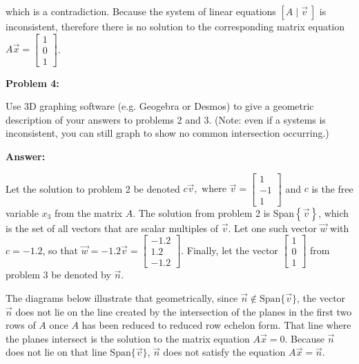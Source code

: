 \documentclass[10pt,letterpaper,final]{report}
\begin{document}
\noindent which is a contradiction. Because the system of linear equations $\left[A \mid \vec{v}\ \right]$ is inconsistent, therefore there is no solution to the corresponding matrix equation $A\vec{x} = \begin{bmatrix}1 \\0 \\1\end{bmatrix}$.

\pagebreak

\noindent\textbf{Problem 4:}
\medskip

Use 3D graphing software (e.g. Geogebra or Desmos) to give a geometric description of your answers to problems 2 and 3. (Note: even if a systems is inconsistent, you can still graph to show no common intersection occurring.)

\medskip
\noindent\textbf{Answer:}
\medskip

Let the solution to problem 2 be denoted $c\vec{v}, \text{ where }\vec{v} = \begin{bmatrix}1 \\-1 \\1\end{bmatrix}$ and $c$ is the free variable $x_3$ from the matrix $A$. The solution from problem 2 is Span$\left\{\vec{v}\right\}$, which is the set of all vectors that are scalar multiples of $\vec{v}$. Let one such vector $\vec{w}$ with $c = -1.2$, so that $\vec{w} = -1.2\vec{v} = \begin{bmatrix}-1.2\\1.2\\-1.2\end{bmatrix}$. Finally, let the vector $\begin{bmatrix}1 \\0 \\1\end{bmatrix}$ from problem 3 be denoted by $\vec{n}$.

The diagrams below illustrate that geometrically, since $\vec{n} \not\in \mathrm{Span}\{\vec{v}\}$, the vector $\vec{n}$ does not lie on the line created by the intersection of the planes in the first two rows of $A$ once $A$ has been reduced to reduced row echelon form. That line where the planes intersect is the solution to the matrix equation $A\vec{x} = 0$. Because $\vec{n}$ does not lie on that line $\mathrm{Span}\{\vec{v}\}$, $\vec{n}$ does not satisfy the equation $A\vec{x} = \vec{n}$.
\end{document}
